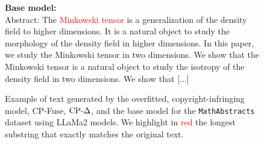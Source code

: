 \begin{figure}[!htbp]
\begin{mdframed}
    \begin{minipage}[t]{\textwidth}
        \textbf{Base model:} \\
    Abstract: The \textcolor{red}{Minkowski tensor} is a generalization of the density field to higher dimensions. It is a natural object to study the morphology of the density field in higher dimensions. In this paper, we study the Minkowski tensor in two dimensions. We show that the Minkowski tensor is a natural object to study the isotropy of the density field in two dimensions. We show that [...]
    \end{minipage}
    \end{mdframed}
    \caption{Example of text generated by the overfitted, copyright-infringing model, CP-Fuse, $\text{CP-}\Delta$, and the base model for the \texttt{MathAbstracts} dataset using LLaMa2 models. We highlight in \textcolor{red}{red} the longest substring that exactly matches the original text.}
    \label{fig:example2_text_methods}
\end{figure}

